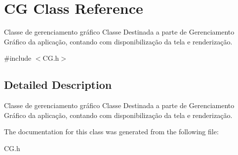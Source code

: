 \hypertarget{classCG}{\section{C\-G Class Reference}
\label{classCG}
}


Classe de gerenciamento gráfico Classe Destinada a parte de Gerenciamento Gráfico da aplicação, contando com disponibilização da tela e renderização.  




{\ttfamily \#include $<$C\-G.\-h$>$}



\subsection{Detailed Description}
Classe de gerenciamento gráfico Classe Destinada a parte de Gerenciamento Gráfico da aplicação, contando com disponibilização da tela e renderização. 

The documentation for this class was generated from the following file\-:\begin{DoxyCompactItemize}
\item 
C\-G.\-h\end{DoxyCompactItemize}
